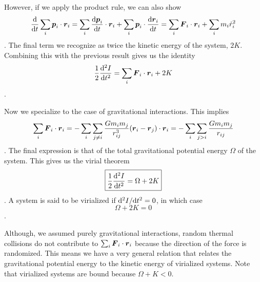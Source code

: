 However, if we apply the product rule, we can also show
\begin{dmath*}
    \frac{\d}{\d t}\sum_i \b p_i\cdot\b r_i
        = \sum_i \frac{\d\b p_i}{\d t}\cdot\b r_i
            +\sum_i \b p_i\cdot\frac{\d\b r_i}{\d t}
        = \sum_i \b F_i\cdot\b r_i
            +\sum_i m_i{\dot r_i}^2
\end{dmath*}.
The final term we recognize as twice the kinetic energy of the system, $2K$.
Combining this with the previous result gives us the identity
\begin{dmath}
    \frac{1}{2}\frac{\d^2I}{\d t^2}
        = \sum_i \b F_i\cdot\b r_i+2K
\end{dmath}.

Now we specialize to the case of gravitational interactions.  This implies
\begin{dmath*}
    \sum_i \b F_i\cdot\b r_i
        = -\sum_i\sum_{j\neq i} \frac{Gm_im_j}{r_{ij}^3}(\b r_i-\b r_j)\cdot \b r_i
        = -\sum_i\sum_{j > i} \frac{Gm_im_j}{r_{ij}}
\end{dmath*}.
The final expression is that of the total gravitational potential energy $\Omega$
of the system.  This gives us the virial theorem
\begin{dmath}\boxed{
    \frac{1}{2}\frac{\d^2I}{\d t^2}
        = \Omega+2K
}\end{dmath}.
A system is said to be virialized if ${\rm d}^2I/{\rm d} t^2=0$, in which case
\begin{dmath}\boxed{
    \Omega+2K = 0
}\end{dmath}.

Although, we assumed purely gravitational interactions, random thermal collisions
do not contribute to $\sum_i\boldsymbol F_i\cdot\boldsymbol r_i$ because the direction of the force is
randomized.  This means we have a very general relation that relates the gravitational potential
energy to the kinetic energy of virialized systems.  Note that virialized systems are
bound because $\Omega+K < 0$.

